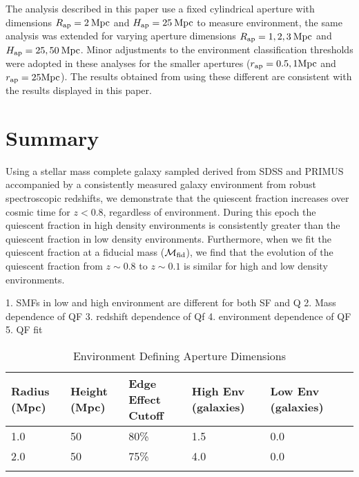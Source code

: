 \documentclass{emulateapj}
\begin{document}
The analysis described in this paper use a fixed cylindrical aperture with dimensions $R_{\rm{ap}} = 2 \: \rm{Mpc}$ and $H_{\rm{ap}} = 25 \: \rm{Mpc}$ to measure environment, the same analysis was extended for varying aperture dimensions $R_{\rm{ap}} = 1, 2, 3 \: \rm{Mpc}$ and $H_{\rm{ap}} = 25, 50 \: \rm{Mpc}$. Minor adjustments to the environment classification thresholds were adopted in these analyses for the smaller apertures ($r_{\rm{ap}} = 0.5, 1 \rm{Mpc}$ and $r_{\rm{ap}} = 25 \rm{Mpc}$). The results obtained from using these different are consistent with the results displayed in this paper. 

\section{Summary} \label{sec:summary}
Using a stellar mass complete galaxy sampled derived from SDSS and PRIMUS accompanied by a consistently measured galaxy environment from robust spectroscopic redshifts, we demonstrate that the quiescent fraction increases over cosmic time for $ z < 0.8$, regardless of environment. During this epoch the quiescent fraction in high density environments is consistently greater than the quiescent fraction in low density environments. Furthermore, when we fit the quiescent fraction at a fiducial mass ($\mathcal{M}_{\rm{fid}}$), we find that the evolution of the quiescent fraction from $z \sim 0.8$ to $z \sim 0.1$ is similar for high and low density environments. 


1. SMFs in low and high environment are different for both SF and Q
2. Mass dependence of QF
3. redshift dependence of Qf
4. environment dependence of QF
5. QF fit 

%
%


\appendix
\begin{table*} %
  \caption{Environment Defining Aperture Dimensions}
  \label{tab:aperture}
  \begin{center}
    \leavevmode
    \begin{tabular}{llllll} \hline \hline              
  Radius (Mpc)          &Height (Mpc)      & Edge Effect Cutoff &High Env (galaxies) &Low Env (galaxies) \\ \hline 
  1.0 &50 & 80\% & 1.5 & 0.0          \\
  2.0 &50 & 75\% & 4.0 & 0.0          \\ \hline
  \multicolumn{5}{l}{}                                             \\       
    \end{tabular}
  \end{center}
\end{table*}
\end{document}
